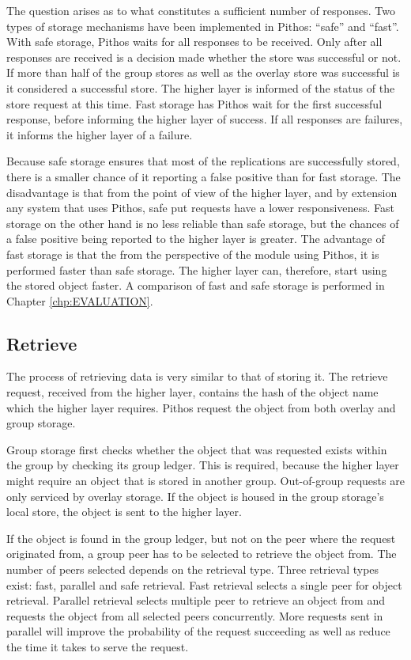 The question arises as to what constitutes a sufficient number of responses. Two types of storage mechanisms have been implemented in Pithos: ``safe'' and ``fast''. With safe storage, Pithos waits for all responses to be received. Only after all responses are received is a decision made whether the store was successful or not. If more than half of the group stores as well as the overlay store was successful is it considered a successful store. The higher layer is informed of the status of the store request at this time. Fast storage has Pithos wait for the first successful response, before informing the higher layer of success. If all responses are failures, it informs the higher layer of a failure.

Because safe storage ensures that most of the replications are successfully stored, there is a smaller chance of it reporting a false positive than for fast storage. The disadvantage is that from the point of view of the higher layer, and by extension any system that uses Pithos, safe put requests have a lower responsiveness. Fast storage on the other hand is no less reliable than safe storage, but the chances of a false positive being reported to the higher layer is greater. The advantage of fast storage is that the from the perspective of the module using Pithos, it is performed faster than safe storage. The higher layer can, therefore, start using the stored object faster. A comparison of fast and safe storage is performed in Chapter \ref{chp:EVALUATION}.

\subsection{Retrieve}

The process of retrieving data is very similar to that of storing it. The retrieve request, received from the higher layer, contains the hash of the object name which the higher layer requires. Pithos request the object from both overlay and group storage.

Group storage first checks whether the object that was requested exists within the group by checking its group ledger. This is required, because the higher layer might require an object that is stored in another group. Out-of-group requests are only serviced by overlay storage. If the object is housed in the group storage's local store, the object is sent to the higher layer.

If the object is found in the group ledger, but not on the peer where the request originated from, a group peer has to be selected to retrieve the object from. The number of peers selected depends on the retrieval type. Three retrieval types exist: fast, parallel and safe retrieval. Fast retrieval selects a single peer for object retrieval. Parallel retrieval selects multiple peer to retrieve an object from and requests the object from all selected peers concurrently. More requests sent in parallel will improve the probability of the request succeeding as well as reduce the time it takes to serve the request.

